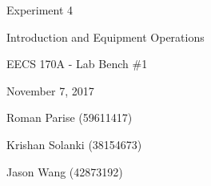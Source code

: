 \begin{titlepage}
	\centering
	\vspace{2.5cm}
	{\huge Experiment 4 \par}
	{\LARGE Introduction and Equipment Operations \par}
	\vspace{1cm}
	{\Large EECS 170A - Lab Bench \#1 \par}
	{\Large November 7, 2017 \par}
	\vspace{1cm}
	{\large Roman Parise (59611417) \par}
	{\large Krishan Solanki (38154673) \par}
	{\large Jason Wang (42873192) \par}
	\vspace{1cm}
\end{titlepage}

